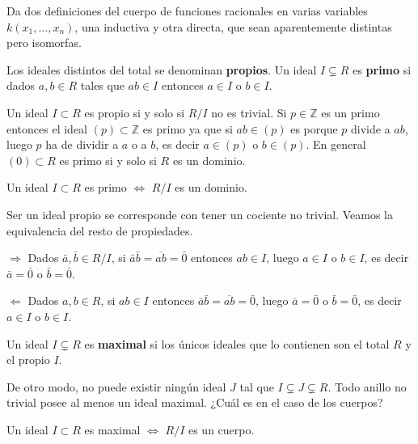 Da dos definiciones del cuerpo de funciones racionales en varias
variables \(k(x_1,\dots,x_n)\), una inductiva y otra directa, que sean
aparentemente distintas pero isomorfas. 


Los ideales distintos del total se denominan \textbf{propios}. Un ideal
\(I\subsetneq R\) es \textbf{primo} si dados \(a,b\in R\) tales que
\(ab\in I\) entonces \(a\in I\) o \(b\in I\). 


Un ideal \(I\subset R\) es propio si y solo si \(R/I\) no es trivial. Si
\(p\in\mathbb Z\) es un primo entonces el ideal \((p)\subset \mathbb Z\)
es primo ya que si \(ab\in (p)\) es porque \(p\) divide a \(ab\), luego
\(p\) ha de dividir a \(a\) o a \(b\), es decir \(a\in(p)\) o
\(b\in(p)\). En general \((0)\subset R\) es primo si y solo si \(R\) es
un dominio. 


Un ideal \(I\subset R\) es primo \(\Leftrightarrow\) \(R/I\) es un
dominio. 


Ser un ideal propio se corresponde con tener un cociente no trivial.
Veamos la equivalencia del resto de propiedades.

\(\Rightarrow\) Dados \(\bar a,\bar b\in R/I\), si
\(\bar a\bar b =\overline{ab}=\bar 0\) entonces \(ab\in I\), luego
\(a\in I\) o \(b\in I\), es decir \(\bar a=\bar 0\) o \(\bar b=\bar 0\).

\(\Leftarrow\) Dados \(a,b\in R\), si \(ab\in I\) entonces
\(\bar a\bar b=\overline{ab}=\bar 0\), luego \(\bar a=\bar 0\) o
\(\bar b=\bar 0\), es decir \(a\in I\) o \(b\in I\).



Un ideal \(I\subsetneq R\) es \textbf{maximal} si los únicos ideales que
lo contienen son el total \(R\) y el propio \(I\). 


De otro modo, no puede existir ningún ideal \(J\) tal que
\(I\subsetneq J\subsetneq R\). Todo anillo no trivial posee al menos un
ideal maximal. ¿Cuál es en el caso de los cuerpos? 


Un ideal \(I\subset R\) es maximal \(\Leftrightarrow\) \(R/I\) es un
cuerpo. 

